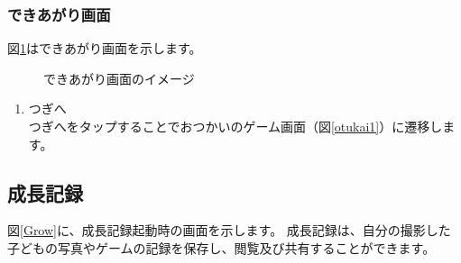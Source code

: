\documentclass[a4j]{jarticle}
\begin{document}
\newpage
\subsubsection{できあがり画面}
図\ref{completion}はできあがり画面を示します。\\

\begin{figure}[H]
    \begin{center}
    \caption {できあがり画面のイメージ}
    \label{completion}
    \end{center}
\end{figure}

\begin{enumerate}
  \renewcommand{\labelenumi}{\textcircled{\scriptsize \theenumi}}
\item つぎへ\\
  つぎへをタップすることでおつかいのゲーム画面（図\ref{otukai1}）に遷移します。
\end{enumerate}


\newpage
\subsection{成長記録}\label{grow}
図\ref{Grow}に、成長記録起動時の画面を示します。
成長記録は、自分の撮影した子どもの写真やゲームの記録を保存し、閲覧及び共有することができます。
\end{document}
